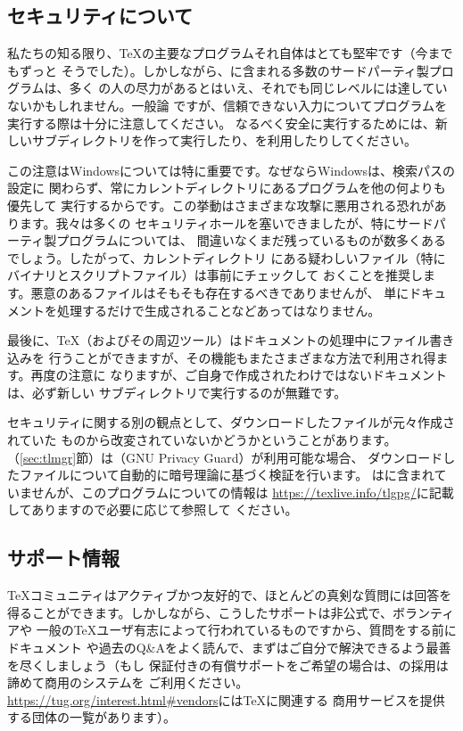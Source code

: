 \documentclass[uplatex,dvipdfmx,12pt,tombow]{jsarticle}
\begin{document}
\subsection{セキュリティについて}
\label{sec:security}

私たちの知る限り、\TeX の主要なプログラムそれ自体はとても堅牢です（今までもずっと
そうでした）。しかしながら、\TL に含まれる多数のサードパーティ製プログラムは、多く
の人の尽力があるとはいえ、それでも同じレベルには達していないかもしれません。一般論
ですが、信頼できない入力についてプログラムを実行する際は十分に注意してください。
なるべく安全に実行するためには、新しいサブディレクトリを作って実行したり、を利用したりしてください。

この注意はWindowsについては特に重要です。なぜならWindowsは、検索パスの設定に
関わらず、常にカレントディレクトリにあるプログラムを他の何よりも優先して
実行するからです。この挙動はさまざまな攻撃に悪用される恐れがあります。我々は多くの
セキュリティホールを塞いできましたが、特にサードパーティ製プログラムについては、
間違いなくまだ残っているものが数多くあるでしょう。したがって、カレントディレクトリ
にある疑わしいファイル（特にバイナリとスクリプトファイル）は事前にチェックして
おくことを推奨します。悪意のあるファイルはそもそも存在するべきでありませんが、
単にドキュメントを処理するだけで生成されることなどあってはなりません。

最後に、\TeX （およびその周辺ツール）はドキュメントの処理中にファイル書き込みを
行うことができますが、その機能もまたさまざまな方法で利用され得ます。再度の注意に
なりますが、ご自身で作成されたわけではないドキュメントは、必ず新しい
サブディレクトリで実行するのが無難です。

セキュリティに関する別の観点として、ダウンロードしたファイルが元々作成されていた
ものから改変されていないかどうかということがあります。%
（\ref{sec:tlmgr}節）は（GNU Privacy Guard）が利用可能な場合、
ダウンロードしたファイルについて自動的に暗号理論に基づく検証を行います。
は\TL に含まれていませんが、このプログラムについての情報は
\url{https://texlive.info/tlgpg/}に記載してありますので必要に応じて参照して
ください。

\subsection{サポート情報}
\label{sec:help}

\TeX コミュニティはアクティブかつ友好的で、ほとんどの真剣な質問には回答を
得ることができます。しかしながら、こうしたサポートは非公式で、ボランティアや
一般の\TeX ユーザ有志によって行われているものですから、質問をする前にドキュメント
や過去のQ\&Aをよく読んで、まずはご自分で解決できるよう最善を尽くしましょう（もし
保証付きの有償サポートをご希望の場合は、\TL の採用は諦めて商用のシステムを
ご利用ください。\url{https://tug.org/interest.html#vendors}には\TeX に関連する
商用サービスを提供する団体の一覧があります）。
\end{document}
